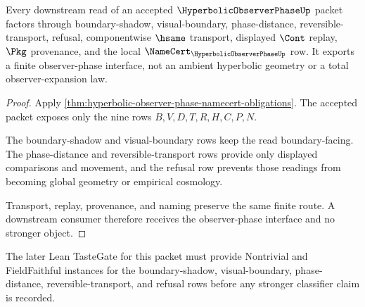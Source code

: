 \begin{theorem}\label{thm:hyperbolic-observer-phase-downstream-boundary}
Every downstream read of an accepted $\HyperbolicObserverPhaseUp$ packet factors through boundary-shadow, visual-boundary, phase-distance, reversible-transport, refusal, componentwise $\hsame$ transport, displayed $\Cont$ replay, $\Pkg$ provenance, and the local $\NameCert_{\HyperbolicObserverPhaseUp}$ row. It exports a finite observer-phase interface, not an ambient hyperbolic geometry or a total observer-expansion law.
\end{theorem}
\begin{proof}
Apply \autoref{thm:hyperbolic-observer-phase-namecert-obligations}. The accepted packet exposes only the nine rows $B,V,D,T,R,H,C,P,N$.

The boundary-shadow and visual-boundary rows keep the read boundary-facing. The phase-distance and reversible-transport rows provide only displayed comparisons and movement, and the refusal row prevents those readings from becoming global geometry or empirical cosmology.

Transport, replay, provenance, and naming preserve the same finite route. A downstream consumer therefore receives the observer-phase interface and no stronger object.
\end{proof}

The later Lean TasteGate for this packet must provide Nontrivial and FieldFaithful instances for the boundary-shadow, visual-boundary, phase-distance, reversible-transport, and refusal rows before any stronger classifier claim is recorded.




